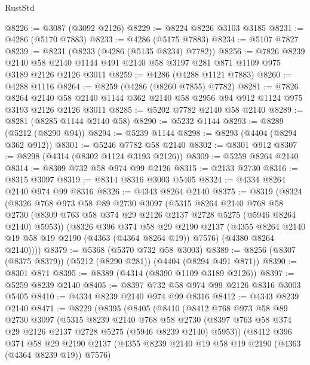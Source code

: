 \begin{lexlean}{RustStd}
\begin{coremodule}
{\begin{coremodule}
{{{{{{{{{{{{{{{{@8226 := @3087 (@3092 @2126)
@8229 := @8224 @8226 @3103 @3185
@8231 := @4286 (@5170 @7883)
@8233 := @4286 (@5175 @7883)
@8234 := @5107 @7827
@8239 := @8231 (@8233 (@4286 (@5135 @8234) @7782))
@8256 := @7826
    @8239
    @2140
    @58
    @2140
    @1144
    @491
    @2140
    @58
    @3197
    @281
    @871
    @1109
    @975
    @3189
    @2126
    @2126
    @3011
@8259 := @4286 (@4288 @1121 @7883)
@8260 := @4288 @1116
@8264 := @8259 (@4286 (@8260 @7855) @7782)
@8281 := @7826
    @8264
    @2140
    @58
    @2140
    @1144
    @362
    @2140
    @58
    @2956
    @94
    @912
    @1124
    @975
    @3193
    @2126
    @2126
    @3011
@8285 := @5202 @7782 @2140 @58 @2140
@8289 := @8281 (@8285 @1144 @2140 @58)
@8290 := @5232 @1144
@8293 := @8289 (@5212 (@8290 @94))
@8294 := @5239 @1144
@8298 := @8293 (@4404 (@8294 @362 @912))
@8301 := @5246 @7782 @58 @2140
@8302 := @8301 @912
@8307 := @8298 (@4314 (@8302 @1124 @3193 @2126))
@8309 := @5259 @8264 @2140
@8314 := @8309 @732 @58 @974 @99 @2126
@8315 := @2133 @2730
@8316 := @8315 @3097
@8319 := @8314 @8316 @3003 @5405
@8324 := @4334 @8264 @2140 @974 @99 @8316
@8326 := @4343 @8264 @2140
@8375 := @8319
    (@8324
      (@8326
        @768
        @973
        @58
        @89
        @2730
        @3097
        (@5315
          @8264
          @2140
          @768
          @58
          @2730
          (@8309 @763 @58 @374 @29 @2126 @2137 @2728 @5275 (@5946 @8264 @2140) @5953))
        (@8326
          @396
          @374
          @58
          @29
          @2190
          @2137
          (@4355 @8264 @2140 @19 @58 @19 @2190 (@4363 (@4364 @8264 @19)) @7576)
          (@4380 @8264 @2140))))
@8379 := @5368 (@5370 @732 @58 @3003)
@8389 := @8256 (@8307 (@8375 @8379)) (@5212 (@8290 @281)) (@4404 (@8294 @491 @871))
@8390 := @8301 @871
@8395 := @8389 (@4314 (@8390 @1109 @3189 @2126))
@8397 := @5259 @8239 @2140
@8405 := @8397 @732 @58 @974 @99 @2126 @8316 @3003 @5405
@8410 := @4334 @8239 @2140 @974 @99 @8316
@8412 := @4343 @8239 @2140
@8471 := @8229
    (@8395
      (@8405
        (@8410
          (@8412
            @768
            @973
            @58
            @89
            @2730
            @3097
            (@5315
              @8239
              @2140
              @768
              @58
              @2730
              (@8397 @763 @58 @374 @29 @2126 @2137 @2728 @5275 (@5946 @8239 @2140) @5953))
            (@8412
              @396
              @374
              @58
              @29
              @2190
              @2137
              (@4355 @8239 @2140 @19 @58 @19 @2190 (@4363 (@4364 @8239 @19)) @7576)
}}}}}}}}}}}}}}}}
\end{coremodule}}
\end{coremodule}
\end{lexlean}
